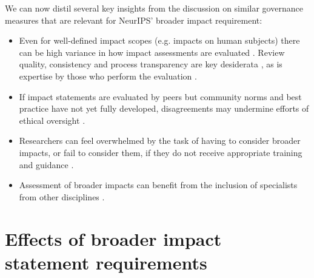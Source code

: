 \documentclass[11pt,english]{article}
\begin{document}
	We can now distil several key insights from the discussion on similar governance measures that are relevant for NeurIPS' broader impact requirement:
	
	\begin{itemize}
		\item Even for well-defined impact scopes (e.g. impacts on human subjects) there can be high variance in how impact assessments are evaluated \citep{dziak_variations_2005,larson_survey_2004,shah_how_2004,mcwilliams_problematic_2003,goldman_inconsistency_1982}. Review quality, consistency and process transparency are key desiderata \citep{whitney_principal_2008}, as is expertise by those who perform the evaluation \citep{bozeman_broad_2009,holbrook_peer_2011,bozeman_socio-economic_2017}. 
		\item If impact statements are evaluated by peers but community norms and best practice have not yet fully developed, disagreements may undermine efforts of ethical oversight \citep{kenneally_cyber-security_2014}.
		\item Researchers can feel overwhelmed by the task of having to consider broader impacts, or fail to consider them, if they do not receive appropriate training and guidance \citep{owen_responsible_2010}. 
		\item Assessment of broader impacts can benefit from the inclusion of specialists from other disciplines \citep{owen_responsible_2010}.
	\end{itemize}
	
	
	\section*{Effects of broader impact statement requirements}
	
\end{document}

